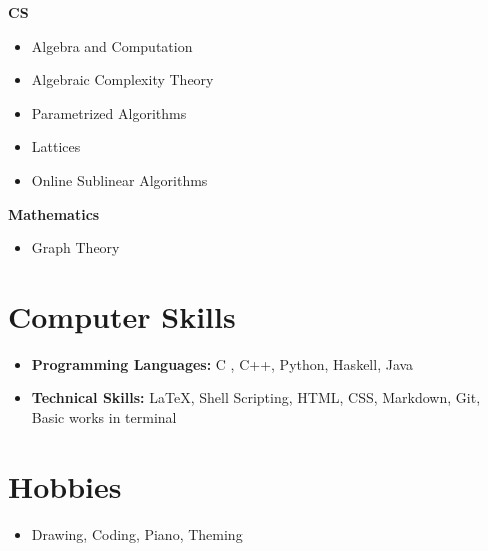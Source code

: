 \documentclass[10pt,a4paper,sans,colorlinks]{moderncv}        %
\begin{document}
\begin{itemize}
\begin{itemize}
	\end{itemize}
\end{itemize}



			

	
	
	
	\section{Computer Skills}
	
	\begin{itemize}
		
		\item \textbf{Programming Languages:} C , C++, Python, Haskell, Java 
		
		\item \textbf{Technical Skills:} \LaTeX , Shell Scripting, HTML, CSS, Markdown, Git, Basic works in terminal
		
		
	\end{itemize}
	\section{Hobbies}
	
	\begin{itemize}
		
		\item  Drawing, Coding, Piano, Theming 
		
		
	\end{itemize}
	
\end{document}
